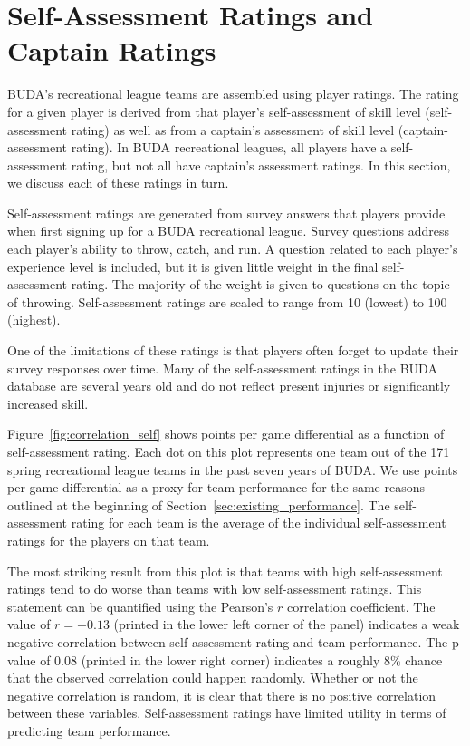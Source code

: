 \section{Self-Assessment Ratings and Captain Ratings}\label{sec:self_rating}

BUDA’s recreational league teams are assembled using player ratings. The rating for a given player is derived from that player's self-assessment of skill level (self-assessment rating) as well as from a captain's assessment of skill level (captain-assessment rating). In BUDA recreational leagues, all players have a self-assessment rating, but not all have captain's assessment ratings.  In this section, we discuss each of these ratings in turn.

Self-assessment ratings are generated from survey answers that players provide when first signing up for a BUDA recreational league. Survey questions address each player's ability to throw, catch, and run.  A question related to each player's experience level is included, but it is given little weight in the final self-assessment rating. The majority of the weight is given to questions on the topic of throwing. Self-assessment ratings are scaled to range from 10 (lowest) to 100 (highest).

One of the limitations of these ratings is that players often forget to update their survey responses over time. Many of the self-assessment ratings in the BUDA database are several years old and do not reflect present injuries or significantly increased skill.

Figure~\ref{fig:correlation_self} shows points per game differential as a function of self-assessment rating. Each dot on this plot represents one team out of the 171 spring recreational league teams in the past seven years of BUDA. We use points per game differential as a proxy for team performance for the same reasons outlined at the beginning of Section~\ref{sec:existing_performance}. The self-assessment rating for each team is the average of the individual self-assessment ratings for the players on that team.

The most striking result from this plot is that teams with high self-assessment ratings tend to do worse than teams with low self-assessment ratings. This statement can be quantified using the Pearson's $r$ correlation coefficient. The value of $r = -0.13$ (printed in the lower left corner of the panel) indicates a weak negative correlation between self-assessment rating and team performance.   The p-value of 0.08 (printed in the lower right corner) indicates a roughly 8\% chance that the observed correlation could happen randomly. Whether or not the negative correlation is random, it is clear that there is no positive correlation between these variables.  Self-assessment ratings have limited utility in terms of predicting team performance.

